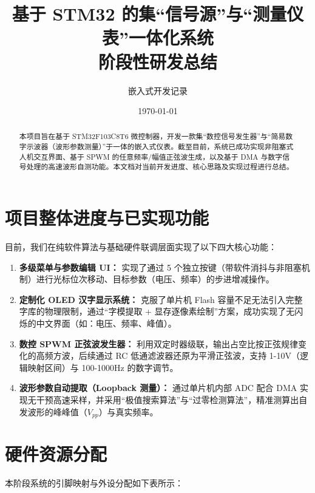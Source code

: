 \documentclass[a4paper,11pt]{ctexart}
\title{\textbf{基于 STM32 的集“信号源”与“测量仪表”一体化系统}\\ \Large 阶段性研发总结}
\author{嵌入式开发记录}
\date{\today}
\begin{document}
\maketitle

\begin{abstract}
本项目旨在基于 STM32F103C8T6 微控制器，开发一款集“数控信号发生器”与“简易数字示波器（波形参数测量）”于一体的嵌入式仪表。截至目前，系统已成功实现非阻塞式人机交互界面、基于 SPWM 的任意频率/幅值正弦波生成，以及基于 DMA 与数字信号处理的高速波形自测功能。本文档对当前开发进度、核心思路及实现过程进行总结。
\end{abstract}

\section{项目整体进度与已实现功能}

目前，我们在纯软件算法与基础硬件联调层面实现了以下四大核心功能：
\begin{enumerate}
    \item \textbf{多级菜单与参数编辑 UI：} 实现了通过 5 个独立按键（带软件消抖与非阻塞机制）进行光标位次移动、目标参数（电压、频率）的步进增减操作。
    \item \textbf{定制化 OLED 汉字显示系统：} 克服了单片机 Flash 容量不足无法引入完整字库的物理限制，通过“字模提取 + 显存逐像素绘制”方案，成功实现了无闪烁的中文界面（如：电压、频率、峰值）。
    \item \textbf{数控 SPWM 正弦波发生器：} 利用双定时器级联，输出占空比按正弦规律变化的高频方波，后续通过 RC 低通滤波器还原为平滑正弦波，支持 1-10V（逻辑映射区间）与 100-1000Hz 的数字调节。
    \item \textbf{波形参数自动提取（Loopback 测量）：} 通过单片机内部 ADC 配合 DMA 实现无干预高速采样，并采用“极值搜索算法”与“过零检测算法”，精准测算出自发波形的峰峰值（$V_{pp}$）与真实频率。
\end{enumerate}

\section{硬件资源分配}

本阶段系统的引脚映射与外设分配如下表所示：
\end{document}
